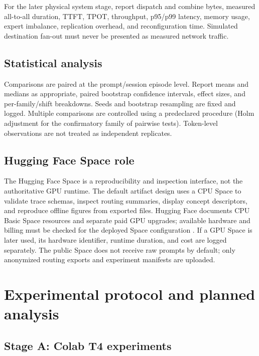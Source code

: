 \documentclass[a4paper,preprint,review,12pt,authoryear]{elsarticle}
\begin{document}
For the later physical system stage, report dispatch and combine bytes, measured all-to-all duration, TTFT, TPOT, throughput, p95/p99 latency, memory usage, expert imbalance, replication overhead, and reconfiguration time. Simulated destination fan-out must never be presented as measured network traffic.

\subsection{Statistical analysis}

Comparisons are paired at the prompt/session episode level. Report means and medians as appropriate, paired bootstrap confidence intervals, effect sizes, and per-family/shift breakdowns. Seeds and bootstrap resampling are fixed and logged. Multiple comparisons are controlled using a predeclared procedure (Holm adjustment for the confirmatory family of pairwise tests). Token-level observations are not treated as independent replicates.

\subsection{Hugging Face Space role}

The Hugging Face Space is a reproducibility and inspection interface, not the authoritative GPU runtime. The default artifact design uses a CPU Space to validate trace schemas, inspect routing summaries, display concept descriptors, and reproduce offline figures from exported files. Hugging Face documents CPU Basic Space resources and separate paid GPU upgrades; available hardware and billing must be checked for the deployed Space configuration \citep{huggingface2026spaces}. If a GPU Space is later used, its hardware identifier, runtime duration, and cost are logged separately. The public Space does not receive raw prompts by default; only anonymized routing exports and experiment manifests are uploaded.

\section{Experimental protocol and planned analysis}
\label{sec:protocol}

\subsection{Stage A: Colab T4 experiments}
\end{document}
